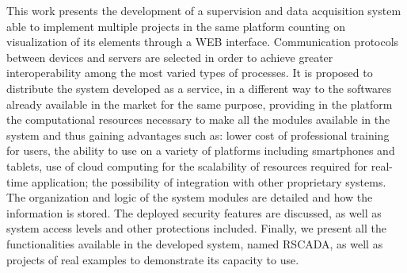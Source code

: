 This work presents the development of a supervision and data acquisition system able to implement multiple projects in the same platform counting on visualization of its elements through a WEB interface. Communication protocols between devices and servers are selected in order to achieve greater interoperability among the most varied types of processes. It is proposed to distribute the system developed as a service, in a different way to the softwares already available in the market for the same purpose, providing in the platform the computational resources necessary to make all the modules available in the system and thus gaining advantages such as: lower cost of professional training for users, the ability to use on a variety of platforms including smartphones and tablets, use of cloud computing for the scalability of resources required for real-time application; the possibility of integration with other proprietary systems. The organization and logic of the system modules are detailed and how the information is stored. The deployed security features are discussed, as well as system access levels and other protections included. Finally, we present all the functionalities available in the developed system, named RSCADA, as well as projects of real examples to demonstrate its capacity to use.


